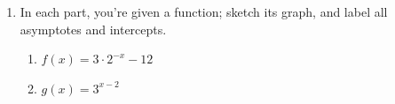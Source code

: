 \documentclass{article}
\begin{document}
\begin{enumerate}
\begin{enumerate}
\begin{enumerate}
    \end{enumerate}

  \end{enumerate}

\item  In each part, you're given a function; sketch its graph, and label all asymptotes and intercepts. 
  \begin{enumerate}
  \item
    \begin{problem}[\vfill]
      $f(x) = 3 \cdot 2^{-x} - 12$
    \end{problem}

  \item
    \begin{problem}[\vfill]
      $g(x) = 3^{x - 2}$
    \end{problem}

  \end{enumerate}

\end{enumerate}
\end{document}
